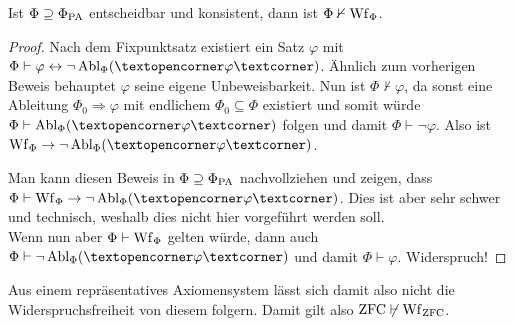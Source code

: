 \begin{satz}
	Ist $\Phi\supseteq\Phi_{\operatorname{PA}}$ entscheidbar und konsistent, dann ist $\Phi\nvdash \operatorname{Wf}_\Phi$.
\end{satz}
\begin{proof}
	Nach dem Fixpunktsatz existiert ein Satz $\varphi$ mit $\Phi\vdash\varphi\leftrightarrow\neg \Abl_\Phi(\opencorner\varphi\closecorner)$. Ähnlich zum vorherigen Beweis \glqq behauptet\grqq{} $\varphi$ seine eigene Unbeweisbarkeit. Nun ist $\Phi\nvdash\varphi$, da sonst eine Ableitung $\Phi_0\Rightarrow\varphi$ mit endlichem $\Phi_0\subseteq\Phi$ existiert und somit würde $\Phi\vdash \Abl_\Phi(\opencorner\varphi\closecorner)$ folgen und damit $\Phi\vdash \neg\varphi$. Also ist $\Wf_\Phi\rightarrow\neg \Abl_\Phi(\opencorner\varphi\closecorner)$.
	
	Man kann diesen Beweis in $\Phi\supseteq\Phi_{\operatorname{PA}}$ nachvollziehen und zeigen, dass $\Phi\vdash \Wf_\Phi \rightarrow \neg \Abl_\Phi(\opencorner\varphi\closecorner)$. Dies ist aber sehr schwer und technisch, weshalb dies nicht hier vorgeführt werden soll.
	\\
	Wenn nun aber $\Phi\vdash \operatorname{Wf}_\Phi$ gelten würde, dann auch $\Phi\vdash \neg \Abl_\Phi(\opencorner\varphi\closecorner)$ und damit $\Phi\vdash \varphi$. Widerspruch!
\end{proof}
Aus einem repräsentatives Axiomensystem lässt sich damit also nicht die Widerspruchsfreiheit von diesem folgern. Damit gilt also $\operatorname{ZFC}\not\vdash\operatorname{Wf}_{\operatorname{ZFC}}$.



